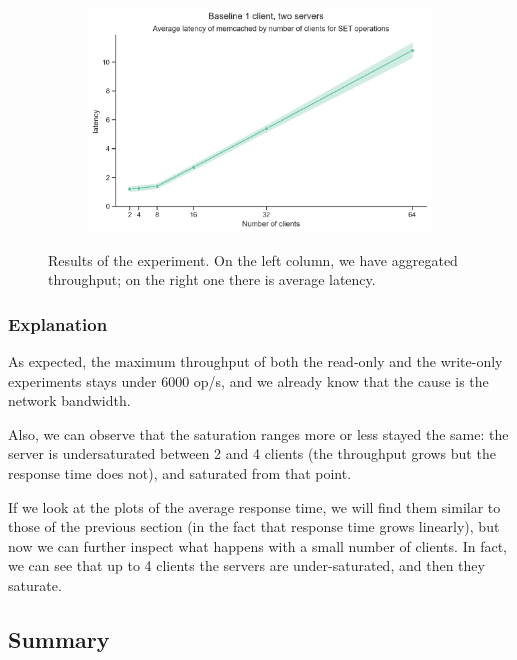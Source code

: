 \documentclass[11pt,a4paper]{article}
\begin{document}
\begin{figure}[H]
\begin{subfigure}[b]{0.5\linewidth}
	\end{subfigure}
	\begin{subfigure}[b]{0.5\linewidth}
		\includegraphics[width=\linewidth]{images/baseline_2/last_graph_set_latency.pdf}
	\end{subfigure}
	\caption{Results of the experiment. On the left column, we have aggregated throughput; on the right one there is average latency.}
	\label{fig:boat1}
\end{figure}


\subsubsection{Explanation}

As expected, the maximum throughput of both the read-only and the write-only experiments stays under 6000 op/s, and we already know that the cause is the network bandwidth.

Also, we can observe that the saturation ranges more or less stayed the same: 
the server is undersaturated between 2 and 4 clients (the throughput grows but the response time does not), and saturated from that point.


If we look at the plots of the average response time, we will find them similar to those of the previous section (in the fact that response time grows linearly), but now we can further inspect what happens with a small number of clients. In fact, we can see that up to 4 clients the servers are under-saturated, and then they saturate.



\subsection{Summary}
\end{document}
